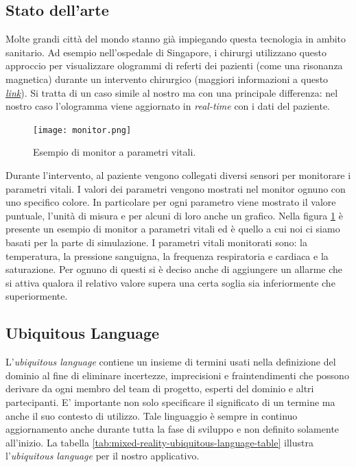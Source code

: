 \subsection{Stato dell'arte}
Molte grandi città del mondo stanno già impiegando questa tecnologia in ambito sanitario. Ad esempio nell'ospedale di Singapore, i chirurgi utilizzano questo approccio per visualizzare ologrammi di referti dei pazienti (come una risonanza magnetica) durante un intervento chirurgico (maggiori informazioni a questo \href{https://govinsider.asia/citizen-centric/how-a-singapore-hospital-uses-holograms-to-assist-surgery-nuhs-ngiam-kee-yuan/} {\textit{link}}). Si tratta di un caso simile al nostro ma con una principale differenza: nel nostro caso l'ologramma viene aggiornato in \textit{real-time} con i dati del paziente.\newline

\begin{figure}
    \centering
    \texttt{[image: monitor.png]}
    \caption{Esempio di monitor a parametri vitali.}
    \label{pic:monitor_example}
\end{figure}

Durante l'intervento, al paziente vengono collegati diversi sensori per monitorare i parametri vitali. \newline I valori dei parametri vengono mostrati nel monitor ognuno con uno specifico colore. In particolare per ogni parametro viene mostrato il valore puntuale, l'unità di misura e per alcuni di loro anche un grafico. \newline Nella figura \ref{pic:monitor_example} è presente un esempio di monitor a parametri vitali ed è quello a cui noi ci siamo basati per la parte di simulazione. I parametri vitali monitorati sono: la temperatura, la pressione sanguigna, la frequenza respiratoria e cardiaca e la saturazione. Per ognuno di questi si è deciso anche di aggiungere un allarme che si attiva qualora il relativo valore supera una certa soglia sia inferiormente che superiormente.

\subsection{Ubiquitous Language}
L'\textit{ubiquitous language} contiene un insieme di termini usati nella definizione del dominio al fine di eliminare incertezze, imprecisioni e fraintendimenti che possono derivare da ogni membro del team di progetto, esperti del dominio e altri partecipanti. E' importante non solo specificare il significato di un termine ma anche il suo contesto di utilizzo. Tale linguaggio è sempre in continuo aggiornamento anche durante tutta la fase di sviluppo e non definito solamente all'inizio. \newline \newline La tabella \ref{tab:mixed-reality-ubiquitous-language-table} illustra l'\textit{ubiquitous language} per il nostro applicativo.

